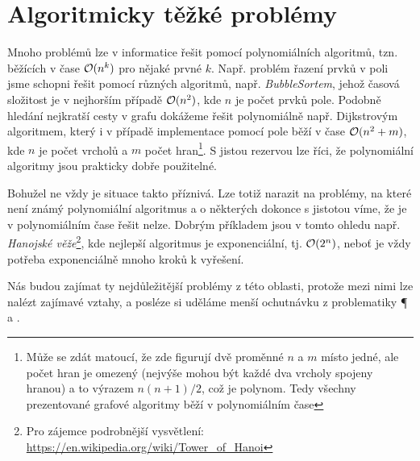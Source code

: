 \chapter{Algoritmicky těžké problémy}\label{chap:tezke-problemy}

Mnoho problémů lze v informatice řešit pomocí polynomiálních algoritmů, tzn. běžících v čase $\mathcal{O}(n^k)$ pro nějaké prvné $k$. Např. problém řazení prvků v poli jsme schopni řešit pomocí různých algoritmů, např. \emph{BubbleSortem}, jehož časová složitost je v nejhorším případě $\mathcal{O}(n^2)$, kde $n$ je počet prvků pole. Podobně hledání nejkratší cesty v grafu dokážeme řešit polynomiálně např. Dijkstrovým algoritmem, který i v případě implementace pomocí pole běží v čase $\mathcal{O}(n^2+m)$, kde $n$ je počet vrcholů a $m$ počet hran\footnote{Může se zdát matoucí, že zde figurují dvě proměnné $n$ a $m$ místo jedné, ale počet hran je omezený (nejvýše mohou být každé dva vrcholy spojeny hranou) a to výrazem $n(n+1)/2$, což je polynom. Tedy všechny prezentované grafové algoritmy běží v polynomiálním čase}. S jistou rezervou lze říci, že polynomiální algoritmy jsou prakticky dobře použitelné.

Bohužel ne vždy je situace takto příznivá. Lze totiž narazit na problémy, na které není známý polynomiální algoritmus a o některých dokonce s jistotou víme, že je v polynomiálním čase řešit nelze. Dobrým příkladem jsou v tomto ohledu např. \emph{Hanojské věže}\footnote{Pro zájemce podrobnější vysvětlení: \url{https://en.wikipedia.org/wiki/Tower_of_Hanoi}}, kde nejlepší algoritmus je exponenciální, tj. $\mathcal{O}(2^n)$, neboť je vždy potřeba exponenciálně mnoho kroků k vyřešení.

Nás budou zajímat ty nejdůležitější problémy z této oblasti, protože mezi nimi lze nalézt zajímavé vztahy, a posléze si uděláme menší ochutnávku z problematiky \P{} a \NP.

